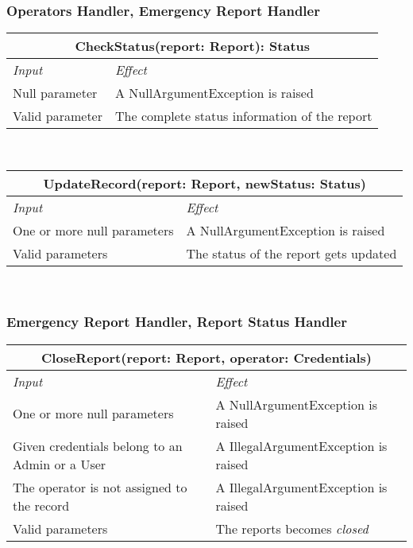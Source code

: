 		
		
		\subsubsection*{Operators Handler, Emergency Report Handler}
			\begin{tabular}{ |l|l| }
				\hline
				\multicolumn{2}{|c|}{CheckStatus(report: Report): Status}\\
				\hline
				\textit{Input} & \textit{Effect}\\ \hline
				Null parameter & A NullArgumentException is raised\\ \hline
				Valid parameter & The complete status information of the report\\ \hline
			\end{tabular}
			\\
			\begin{tabular}{ |l|l| }
				\hline
				\multicolumn{2}{|c|}{UpdateRecord(report: Report, newStatus: Status)}\\
				\hline
				\textit{Input} & \textit{Effect}\\ \hline
				One or more null parameters & A NullArgumentException is raised\\ \hline
				Valid parameters & The status of the report gets updated\\ \hline
			\end{tabular}
			\\
		
		
		
		\subsubsection*{Emergency Report Handler, Report Status Handler}
			\begin{tabular}{ |l|l| }
				\hline
				\multicolumn{2}{|c|}{CloseReport(report: Report, operator: Credentials)}\\
				\hline
				\textit{Input} & \textit{Effect}\\ \hline
				One or more null parameters & A NullArgumentException is raised\\ \hline
				Given credentials belong to an Admin or a User & A IllegalArgumentException is raised\\ \hline
				The operator is not assigned to the record & A IllegalArgumentException is raised\\ \hline
				Valid parameters & The reports becomes \textit{closed}\\ \hline
			\end{tabular}
			\\
		
